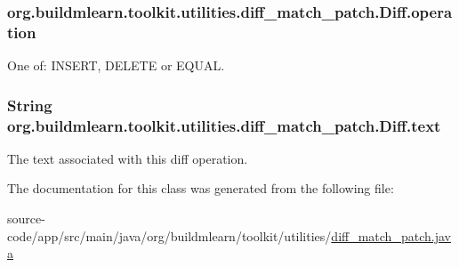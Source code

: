 \subsubsection[{\texorpdfstring{operation}{operation}}]{ org.\+buildmlearn.\+toolkit.\+utilities.\+diff\+\_\+match\+\_\+patch.\+Diff.\+operation}\hypertarget{classorg_1_1buildmlearn_1_1toolkit_1_1utilities_1_1diff__match__patch_1_1Diff_a1f605a7fb5e0ee23ba40ccb697212381}{}\label{classorg_1_1buildmlearn_1_1toolkit_1_1utilities_1_1diff__match__patch_1_1Diff_a1f605a7fb5e0ee23ba40ccb697212381}
One of\+: I\+N\+S\+E\+RT, D\+E\+L\+E\+TE or E\+Q\+U\+AL. 
\subsubsection[{\texorpdfstring{text}{text}}]{\setlength{\rightskip}{0pt plus 5cm}String org.\+buildmlearn.\+toolkit.\+utilities.\+diff\+\_\+match\+\_\+patch.\+Diff.\+text}\hypertarget{classorg_1_1buildmlearn_1_1toolkit_1_1utilities_1_1diff__match__patch_1_1Diff_a64a42555135b9e66c13c757e346a3e88}{}\label{classorg_1_1buildmlearn_1_1toolkit_1_1utilities_1_1diff__match__patch_1_1Diff_a64a42555135b9e66c13c757e346a3e88}
The text associated with this diff operation. 

The documentation for this class was generated from the following file\+:\begin{DoxyCompactItemize}
\item 
source-\/code/app/src/main/java/org/buildmlearn/toolkit/utilities/\hyperlink{diff__match__patch_8java}{diff\+\_\+match\+\_\+patch.\+java}\end{DoxyCompactItemize}
